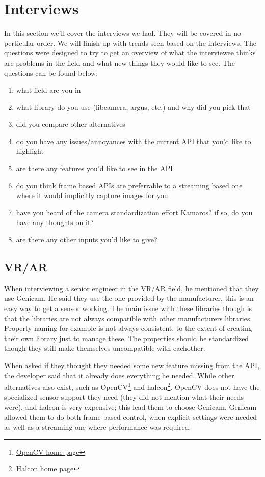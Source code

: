 \chapter{Interviews}
In this section we'll cover the interviews we had. They will be covered in no
perticular order. We will finish up with trends seen based on the interviews.
The questions were designed to try to get an overview of what the interviewee
thinks are problems in the field and what new things they would like to see.
The questions can be found below:

\begin{enumerate}
    \item what field are you in
    \item what library do you use (libcamera, argus, etc.) and why did you pick that
    \item did you compare other alternatives
    \item do you have any issues/annoyances with the current API that you'd like to highlight
    \item are there any features you'd like to see in the API
    \item do you think frame based APIs are preferrable to a streaming based one where it would implicitly capture images for you
    \item have you heard of the camera standardization effort Kamaros? if so, do you have any thoughts on it?
    \item are there any other inputs you'd like to give?
\end{enumerate}

\section{VR/AR}
When interviewing a senior engineer in the VR/AR field, he mentioned that
they use Genicam. He said they use the one provided by the manufacturer, this
is an easy way to get a sensor working. The main issue with these libraries
though is that the libraries are not always compatible with other manufacturers
libraries. Property naming for example is not always consistent, to the extent
of creating their own library just to manage these. The properties should be
standardized though they still make themselves uncompatible with eachother.

When asked if they thought they needed some new feature missing from the API,
the developer said that it already does everything he needed. While other
alternatives also exist, such as OpenCV\footnote{\href{https://opencv.org/}{OpenCV home page}}
and halcon\footnote{\href{https://www.mvtec.com/products/halcon}{Halcon home page}}.
OpenCV does not have the specialized sensor support they need (they did not
mention what their needs were), and halcon is very expensive; this lead them to
choose Genicam. Genicam allowed them to do both frame based control, when
explicit settings were needed as well as a streaming one where performance was
required.

